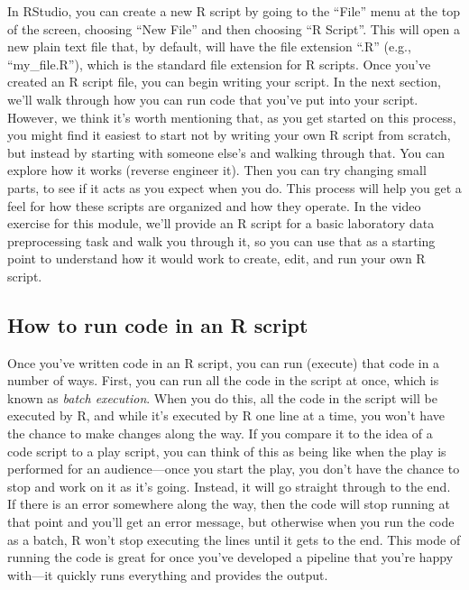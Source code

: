 \documentclass[]{tufte-book}
\begin{document}
In RStudio, you can create a new R script by going to the ``File'' menu at the top
of the screen, choosing ``New File'' and then choosing ``R Script''. This will open
a new plain text file that, by default, will have the file extension ``.R'' (e.g.,
``my\_file.R''), which is the standard file extension for R scripts. Once you've
created an R script file, you can begin writing your script. In the next
section, we'll walk through how you can run code that you've put into your
script. However, we think it's worth mentioning that, as you get started on this
process, you might find it easiest to start not by writing your own R script
from scratch, but instead by starting with someone else's and walking through
that. You can explore how it works (reverse engineer it). Then you can try
changing small parts, to see if it acts as you expect when you do. This process
will help you get a feel for how these scripts are organized and how they
operate. In the video exercise for this module, we'll provide an R script for a
basic laboratory data preprocessing task and walk you through it, so you can use
that as a starting point to understand how it would work to create, edit, and
run your own R script.

\subsection{How to run code in an R script}\label{how-to-run-code-in-an-r-script}

Once you've written code in an R script, you can run (execute) that code in a
number of ways. First, you can run all the code in the script at once, which is
known as \emph{batch execution}. When you do this, all the code in the script will be
executed by R, and while it's executed by R one line at a time, you won't have
the chance to make changes along the way. If you compare it to the idea of a
code script to a play script, you can think of this as being like when the
play is performed for an audience---once you start the play, you don't have
the chance to stop and work on it as it's going. Instead, it will go straight
through to the end. If there is an error somewhere along the way, then the code
will stop running at that point and you'll get an error message, but otherwise
when you run the code as a batch, R won't stop executing the lines until it gets
to the end. This mode of running the code is great for once you've developed a
pipeline that you're happy with---it quickly runs everything and provides the
output.
\end{document}

